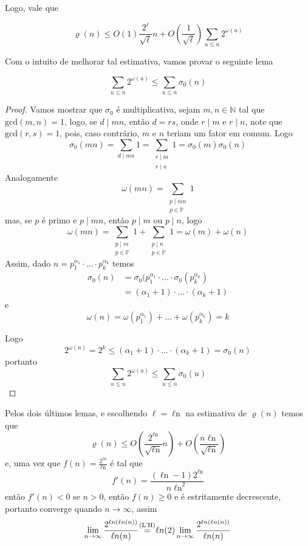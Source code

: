 \documentclass[11pt]{article}
\newcommand{\mbb}[1]{\mathbb{#1}}
\newcommand{\rp}[1]{{\left(#1\right)}}
\newcommand{\cl}[1]{\colorlet{shadecolor}{#1}}
\renewcommand{\ln}[1]{{\mathop{\ell n\rp{#1}}}}
\begin{document}
Logo, vale que

$$\varrho(n)\leq O(1)\frac{2^\ell}{\sqrt{\ell}}n + O\rp{\frac{1}{\sqrt{\ell}}}\sum_{u\leq n}2^{\omega(u)}$$

Com o intuito de melhorar tal estimativa, vamos provar o seguinte lema

\cl{blue!15}
\begin{shaded}
\begin{lemma}
    $$\sum_{u\leq n}2^{\omega(u)}\leq\sum_{u\leq n}\sigma_0(n)$$
\end{lemma}
\end{shaded}

\begin{proof}
    Vamos mostrar que $\sigma_0$ é multiplicativa, sejam $m,n\in\mbb{N}$ tal que $\text{gcd}(m,n)=1$, logo, se $d\mid mn$, então $d=rs$, onde $r\mid m$ e $r\mid n$, note que $\text{gcd}(r,s)=1$, pois, caso contrário, $m$ e $n$ teriam um fator em comum. Logo
    $$\sigma_0(mn)=\sum_{d\mid mn}1=\sum_{\substack{r\mid m\\ r\mid n}}1=\sigma_0(m)\sigma_0(n)$$
    Analogamente
    $$\omega(mn)=\sum_{\substack{p\mid mn\\ p\in\mbb{P}}}1$$
    mas, se $p$ é primo e $p\mid mn$, então $p\mid m$ ou $p\mid n$, logo
    $$\omega(mn)=\sum_{\substack{p\mid m\\ p\in\mbb{P}}}1+\sum_{\substack{p\mid n\\ p\in\mbb{P}}}1=\omega(m)+\omega(n)$$
    Assim, dado $n=p_1^{\alpha_1}\cdot...\cdot p_k^{\alpha_k}$
    temos
    \begin{align*}
        \sigma_0(n) & = \sigma_0(p_1^{\alpha_1}\cdot...\cdot\sigma_0(p_k^{\alpha_k})\\
        & = (\alpha_1+1)\cdot...\cdot(\alpha_k+1)
    \end{align*}
    e
    $$\omega(n)=\omega(p_1^{\alpha_1})+\dots+\omega(p_k^{\alpha_k})=k$$

    Logo
    $$2^{\omega(n)}=2^k\leq(\alpha_1+1)\cdot...\cdot(\alpha_k+1)=\sigma_0(n)$$
    portanto
    $$\sum_{u\leq n}2^{\omega(u)}\leq\sum_{u\leq n}\sigma_0(u)$$
\end{proof}

Pelos dois últimos lemas, e escolhendo $\ell=\ln{\ln{n}}$ na estimativa de $\varrho(n)$ temos que
$$\varrho(n)\leq O\rp{\frac{2^{\ln{\ln{n}}}}{\sqrt{\ln{\ln{n}}}}n}+O\rp{\frac{n\ln{n}}{\sqrt{\ln{\ln{n}}}}}$$
e, uma vez que $f(n)=\frac{2^{\ln{\ln{n}}}}{\ln{n}}$ é tal que
$$f'(n)=\frac{(\ln{2}-1)2^{\ln{\ln{2}}}}{n\ln{n}^2}$$
então $f'(n)<0$ se $n>0$, então $f(n)\geq0$ e é estritamente decrescente, portanto converge quando $n\to\infty$, assim
$$\lim_{n\to\infty}\frac{2^{\ln{\ln{n}}}}{\ln{n}}\stackrel{\mathclap{\text{(L'H)}}}{~=~}\ln{2}\lim_{n\to\infty}\frac{2^{\ln{\ln{n}}}}{\ln{n}}$$
\end{document}
